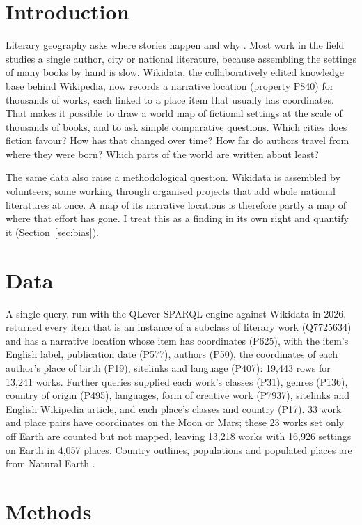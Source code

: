 \documentclass[11pt,a4paper]{article}
\begin{document}
\section{Introduction}
Literary geography asks where stories happen and why \citep{moretti1998}. Most work in the field studies a single author, city or national literature, because assembling the settings of many books by hand is slow. Wikidata, the collaboratively edited knowledge base behind Wikipedia, now records a narrative location (property P840) for thousands of works, each linked to a place item that usually has coordinates. That makes it possible to draw a world map of fictional settings at the scale of thousands of books, and to ask simple comparative questions. Which cities does fiction favour? How has that changed over time? How far do authors travel from where they were born? Which parts of the world are written about least?

The same data also raise a methodological question. Wikidata is assembled by volunteers, some working through organised projects that add whole national literatures at once. A map of its narrative locations is therefore partly a map of where that effort has gone. I treat this as a finding in its own right and quantify it (Section~\ref{sec:bias}).

\section{Data}
A single query, run with the QLever SPARQL engine \citep{qlever} against Wikidata \citep{wikidata} in 2026, returned every item that is an instance of a subclass of literary work (Q7725634) and has a narrative location whose item has coordinates (P625), with the item's English label, publication date (P577), authors (P50), the coordinates of each author's place of birth (P19), sitelinks and language (P407): 19,443 rows for 13,241 works. Further queries supplied each work's classes (P31), genres (P136), country of origin (P495), languages, form of creative work (P7937), sitelinks and English Wikipedia article, and each place's classes and country (P17). 33 work and place pairs have coordinates on the Moon or Mars; these 23 works set only off Earth are counted but not mapped, leaving 13,218 works with 16,926 settings on Earth in 4,057 places. Country outlines, populations and populated places are from Natural Earth \citep{naturalearth}.

\section{Methods}
\end{document}

